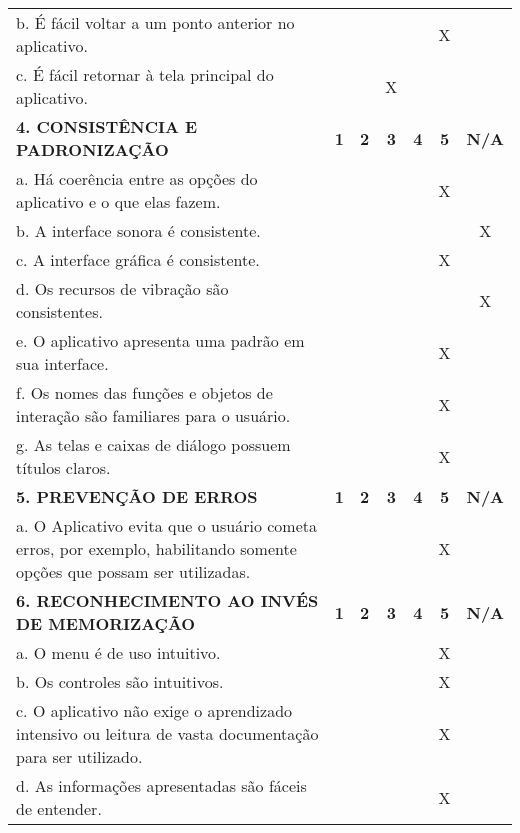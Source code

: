 \documentclass[portuguese,oneside]{tcc}
\begin{document}
\begin{center}
\begin{longtabu}{|L{25em}|c|c|c|c|c|c|}
																							b. É fácil voltar a um ponto anterior no aplicativo. & & & & & X & \\ 
																							c. É fácil retornar à tela principal do aplicativo. & & & X & & & \\ 
																							\textbf{4. CONSISTÊNCIA E PADRONIZAÇÃO} & \textbf{1} & \textbf{2} & \textbf{3} & \textbf{4} & \textbf{5} & \textbf{N/A} \\ 
																							a. Há coerência entre as opções do aplicativo e o que elas fazem. & & & & & X & \\ 
																							b. A interface sonora é consistente. & & & & & & X \\ 
																							c. A interface gráfica é consistente. & & & & & X & \\ 
																							d. Os recursos de vibração são consistentes. & & & & & & X \\ 
																							e. O aplicativo apresenta uma padrão em sua interface. & & & & & X & \\ 
																							f. Os nomes das funções e objetos de interação são familiares para o usuário. & & & & & X & \\ 
																							g. As telas e caixas de diálogo possuem títulos claros. & & & & & X & \\ 
																							\textbf{5. PREVENÇÃO DE ERROS} & \textbf{1} & \textbf{2} & \textbf{3} & \textbf{4} & \textbf{5} & \textbf{N/A} \\ 
																							a. O Aplicativo evita que o usuário cometa erros, por exemplo, habilitando somente opções que possam ser utilizadas. & & & & & X & \\ 
																							\textbf{6. RECONHECIMENTO AO INVÉS DE MEMORIZAÇÃO} & \textbf{1} & \textbf{2} & \textbf{3} & \textbf{4} & \textbf{5} & \textbf{N/A} \\ 
																							a. O  menu é de uso intuitivo. & & & & & X & \\ 
																							b. Os controles são intuitivos. & & & & & X & \\ 
																							c. O aplicativo não exige o aprendizado intensivo ou leitura de vasta documentação para ser utilizado. & & & & & X & \\ 
																							d. As informações apresentadas são fáceis de entender. & & & & & X & \\ 

\end{longtabu}
\end{center}
\end{document}
